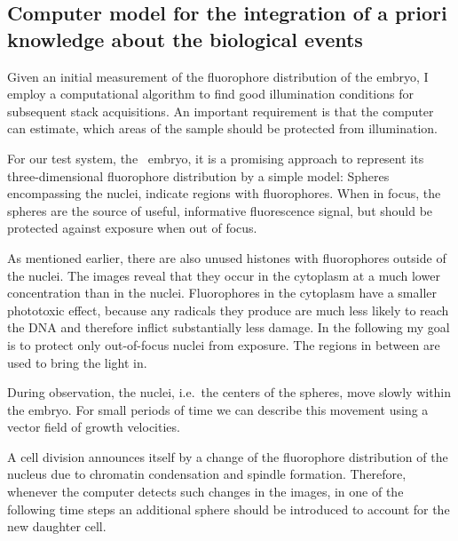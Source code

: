 
\subsection{Computer model for the integration of a priori knowledge
about the biological events} 
Given an initial measurement of the fluorophore distribution of the
embryo, I employ a computational algorithm to find good illumination
conditions for subsequent stack acquisitions. An important requirement
is that the computer can estimate, which areas of the sample should be
protected from illumination.

For our test system, the \celegans\ embryo, it is a promising approach
to represent its three-dimensional fluorophore distribution by a
simple model: Spheres encompassing the nuclei, indicate regions with
fluorophores. When in focus, the spheres are the source of useful,
informative fluorescence signal, but should be protected against
exposure when out of focus.

As mentioned earlier, there are also unused histones with
fluorophores outside of the nuclei. The images reveal that they occur
in the cytoplasm at a much lower concentration than in the
nuclei. Fluorophores in the cytoplasm have a smaller phototoxic
effect, because any radicals they produce are much less likely to
reach the DNA and therefore inflict substantially less damage.  In the
following my goal is to protect only out-of-focus nuclei from
exposure. The regions in between are used to bring the light in.


During observation, the nuclei, i.e.\ the centers of the spheres, move
slowly within the embryo. For small periods of time we can describe
this movement using a vector field of growth velocities.

A cell division announces itself by a change of the fluorophore
distribution of the nucleus due to chromatin condensation and spindle
formation. Therefore, whenever the computer detects such changes in
the images, in one of the following time steps an additional sphere
should be introduced to account for the new daughter cell.

